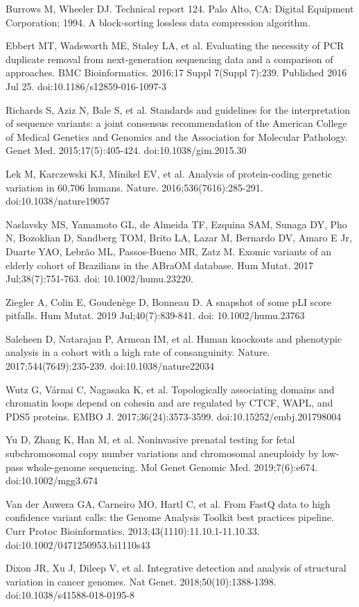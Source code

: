 \documentclass[a4paper,12pt]{article}
\begin{document}
\begin{thebibliography}{100}
Burrows M, Wheeler DJ. Technical report 124. Palo Alto, CA: Digital Equipment Corporation; 1994. A block-sorting lossless data compression algorithm.

Ebbert MT, Wadsworth ME, Staley LA, et al. Evaluating the necessity of PCR duplicate removal from next-generation sequencing data and a comparison of approaches. BMC Bioinformatics. 2016;17 Suppl 7(Suppl 7):239. Published 2016 Jul 25. doi:10.1186/s12859-016-1097-3

Richards S, Aziz N, Bale S, et al. Standards and guidelines for the interpretation of sequence variants: a joint consensus recommendation of the American College of Medical Genetics and Genomics and the Association for Molecular Pathology. Genet Med. 2015;17(5):405-424. doi:10.1038/gim.2015.30

Lek M, Karczewski KJ, Minikel EV, et al. Analysis of protein-coding genetic variation in 60,706 humans. Nature. 2016;536(7616):285-291. doi:10.1038/nature19057

Naslavsky MS, Yamamoto GL, de Almeida TF, Ezquina SAM, Sunaga DY, Pho N, Bozoklian D, Sandberg TOM, Brito LA, Lazar M, Bernardo DV, Amaro E Jr, Duarte YAO, Lebrão ML, Passos-Bueno MR, Zatz M. Exomic variants of an elderly cohort of Brazilians in the ABraOM database. Hum Mutat. 2017 Jul;38(7):751-763. doi: 10.1002/humu.23220.

Ziegler A, Colin E, Goudenège D, Bonneau D. A snapshot of some pLI score pitfalls. Hum Mutat. 2019 Jul;40(7):839-841. doi: 10.1002/humu.23763

Saleheen D, Natarajan P, Armean IM, et al. Human knockouts and phenotypic analysis in a cohort with a high rate of consanguinity. Nature. 2017;544(7649):235-239. doi:10.1038/nature22034

Wutz G, Várnai C, Nagasaka K, et al. Topologically associating domains and chromatin loops depend on cohesin and are regulated by CTCF, WAPL, and PDS5 proteins. EMBO J. 2017;36(24):3573-3599. doi:10.15252/embj.201798004

Yu D, Zhang K, Han M, et al. Noninvasive prenatal testing for fetal subchromosomal copy number variations and chromosomal aneuploidy by low-pass whole-genome sequencing. Mol Genet Genomic Med. 2019;7(6):e674. doi:10.1002/mgg3.674

Van der Auwera GA, Carneiro MO, Hartl C, et al. From FastQ data to high confidence variant calls: the Genome Analysis Toolkit best practices pipeline. Curr Protoc Bioinformatics. 2013;43(1110):11.10.1-11.10.33. doi:10.1002/0471250953.bi1110s43

Dixon JR, Xu J, Dileep V, et al. Integrative detection and analysis of structural variation in cancer genomes. Nat Genet. 2018;50(10):1388-1398. doi:10.1038/s41588-018-0195-8

\end{thebibliography}
\end{document}
